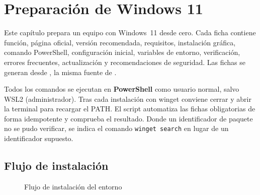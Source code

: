 \chapter{Preparación de Windows 11}\label{cap:windows}

Este capítulo prepara un equipo con Windows~11 desde cero. Cada ficha contiene función, página oficial,
versión recomendada, requisitos, instalación gráfica, comando PowerShell, configuración inicial, variables de
entorno, verificación, errores frecuentes, actualización y recomendaciones de seguridad. Las fichas se generan
desde , la misma fuente de
.

\begin{nota}[Convenciones]
Todos los comandos se ejecutan en \textbf{PowerShell} como usuario normal, salvo WSL2 (administrador). Tras
cada instalación con winget conviene cerrar y abrir la terminal para recargar el PATH. El script
 automatiza las fichas obligatorias de forma idempotente y
 comprueba el resultado. Donde un identificador de paquete no se pudo
verificar, se indica el comando \texttt{winget search} en lugar de un identificador supuesto.
\end{nota}

\section*{Flujo de instalación}
\begin{figure}[H]\centering
{}
\caption{Flujo de instalación del entorno}\label{fig:instalacion}
\end{figure}

